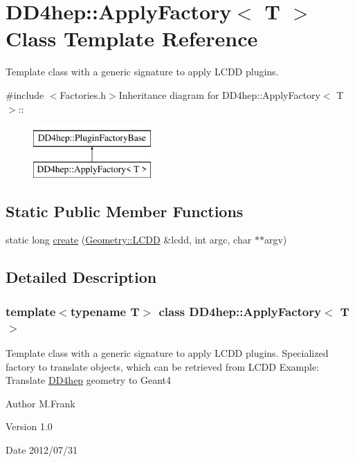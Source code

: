 \hypertarget{class_d_d4hep_1_1_apply_factory}{
\section{DD4hep::ApplyFactory$<$ T $>$ Class Template Reference}
\label{class_d_d4hep_1_1_apply_factory}
}


Template class with a generic signature to apply LCDD plugins.  


{\ttfamily \#include $<$Factories.h$>$}Inheritance diagram for DD4hep::ApplyFactory$<$ T $>$::\begin{figure}[H]
\begin{center}
\leavevmode
\includegraphics[height=2cm]{class_d_d4hep_1_1_apply_factory}
\end{center}
\end{figure}
\subsection*{Static Public Member Functions}
\begin{DoxyCompactItemize}
\item 
static long \hyperlink{class_d_d4hep_1_1_apply_factory_abf2c5831e9f7ddafeb30d13373e0ce82}{create} (\hyperlink{class_d_d4hep_1_1_geometry_1_1_l_c_d_d}{Geometry::LCDD} \&lcdd, int argc, char $\ast$$\ast$argv)
\end{DoxyCompactItemize}


\subsection{Detailed Description}
\subsubsection*{template$<$typename T$>$ class DD4hep::ApplyFactory$<$ T $>$}

Template class with a generic signature to apply LCDD plugins. Specialized factory to translate objects, which can be retrieved from LCDD Example: Translate \hyperlink{namespace_d_d4hep}{DD4hep} geometry to Geant4

\begin{DoxyAuthor}{Author}
M.Frank 
\end{DoxyAuthor}
\begin{DoxyVersion}{Version}
1.0 
\end{DoxyVersion}
\begin{DoxyDate}{Date}
2012/07/31 
\end{DoxyDate}


